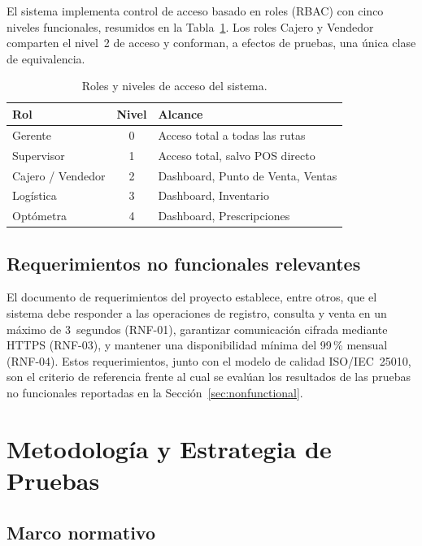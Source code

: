 \documentclass[conference]{IEEEtran}
\begin{document}
El sistema implementa control de acceso basado en roles (RBAC) con cinco niveles funcionales, resumidos en la Tabla~\ref{tab:roles}. Los roles Cajero y Vendedor comparten el nivel~2 de acceso y conforman, a efectos de pruebas, una única clase de equivalencia.

\begin{table}[htbp]
  \caption{Roles y niveles de acceso del sistema.}
  \label{tab:roles}
  \centering
  \begin{tabular}{l c p{4.2cm}}
    \toprule
    \textbf{Rol} & \textbf{Nivel} & \textbf{Alcance} \\
    \midrule
    Gerente & 0 & Acceso total a todas las rutas \\
    Supervisor & 1 & Acceso total, salvo POS directo \\
    Cajero / Vendedor & 2 & Dashboard, Punto de Venta, Ventas \\
    Logística & 3 & Dashboard, Inventario \\
    Optómetra & 4 & Dashboard, Prescripciones \\
    \bottomrule
  \end{tabular}
\end{table}

\subsection{Requerimientos no funcionales relevantes}

El documento de requerimientos del proyecto establece, entre otros, que el sistema debe responder a las operaciones de registro, consulta y venta en un máximo de 3~segundos (RNF-01), garantizar comunicación cifrada mediante HTTPS (RNF-03), y mantener una disponibilidad mínima del 99\,\% mensual (RNF-04). Estos requerimientos, junto con el modelo de calidad ISO/IEC~25010, son el criterio de referencia frente al cual se evalúan los resultados de las pruebas no funcionales reportadas en la Sección~\ref{sec:nonfunctional}.

\section{Metodología y Estrategia de Pruebas}
\label{sec:methodology}

\subsection{Marco normativo}
\end{document}
